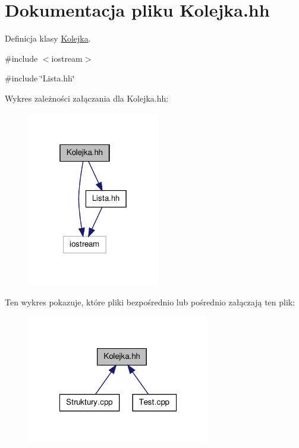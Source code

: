 \hypertarget{_kolejka_8hh}{
\section{Dokumentacja pliku Kolejka.hh}
\label{_kolejka_8hh}
}


Definicja klasy \hyperlink{class_kolejka}{Kolejka}.  


{\ttfamily \#include $<$iostream$>$}\par
{\ttfamily \#include \char`\"{}Lista.hh\char`\"{}}\par
Wykres zależności załączania dla Kolejka.hh:
\nopagebreak
\begin{figure}[H]
\begin{center}
\leavevmode
\includegraphics[width=163pt]{_kolejka_8hh__incl}
\end{center}
\end{figure}
Ten wykres pokazuje, które pliki bezpośrednio lub pośrednio załączają ten plik:
\nopagebreak
\begin{figure}[H]
\begin{center}
\leavevmode
\includegraphics[width=226pt]{_kolejka_8hh__dep__incl}
\end{center}
\end{figure}
